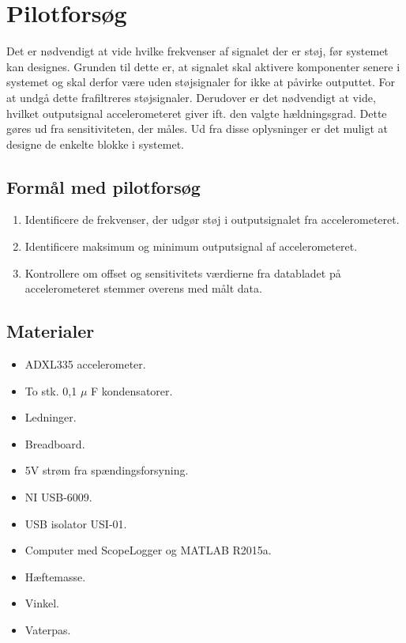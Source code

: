 \section{Pilotforsøg}
Det er nødvendigt at vide hvilke frekvenser af signalet der er støj, før systemet kan designes. Grunden til dette er, at signalet skal aktivere komponenter senere i systemet og skal derfor være uden støjsignaler for ikke at påvirke outputtet. For at undgå dette frafiltreres støjsignaler. Derudover er det nødvendigt at vide, hvilket outputsignal accelerometeret giver ift. den valgte hældningsgrad. Dette gøres ud fra sensitiviteten, der måles. Ud fra disse oplysninger er det muligt at designe de enkelte blokke i systemet.%

\subsection{Formål med pilotforsøg}
\begin{enumerate}
\item Identificere de frekvenser, der udgør støj i outputsignalet fra accelerometeret.
\item Identificere maksimum og minimum outputsignal af accelerometeret.
\item Kontrollere om offset og sensitivitets værdierne fra databladet på accelerometeret stemmer overens med målt data.
\end{enumerate}

\subsection{Materialer}
\begin{itemize}
\item ADXL335 accelerometer.
\item To stk. 0,1 $\mu$ F kondensatorer.
\item Ledninger.
\item Breadboard.
\item 5V strøm fra spændingsforsyning.
\item NI USB-6009.
\item USB isolator USI-01.
\item Computer med ScopeLogger og MATLAB R2015a.
\item Hæftemasse.
\item Vinkel.
\item Vaterpas.
\end{itemize}


